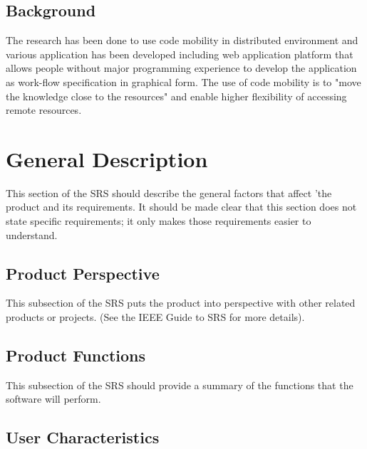 \documentclass{scrreprt}
\begin{document}
	\section{Background}
\noindent

The research has been done to use code mobility in distributed environment \cite{Bart1} and various application has been developed including \cite{Bart2} web application platform that allows people without major programming experience to develop the application as work-flow specification in graphical form. The use of code mobility is to "move the knowledge close to the resources" \cite{Picco} and enable higher flexibility of accessing remote resources.



\chapter{General Description}

This section of the SRS should describe the general factors that affect 'the product and its requirements.  It should be made clear that this section does not state specific requirements; it only makes those requirements easier to understand.

	\section{Product Perspective}

This subsection of the SRS puts the product into perspective with other related products or
projects.  (See the IEEE Guide to SRS for more details).

	\section{Product Functions}

This subsection of the SRS should provide a summary of the functions that the software will perform. 

	\section{User Characteristics}
\end{document}
